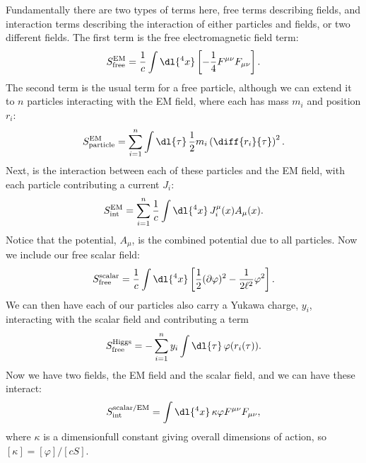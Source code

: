 \documentclass[fleqn]{NotesClass}
\begin{document}
    Fundamentally there are two types of terms here, free terms describing fields, and interaction terms describing the interaction of either particles and fields, or two different fields.
    The first term is the free electromagnetic field term:
    \begin{equation}
        S_{\text{free}}^{\text{EM}} = \frac{1}{c} \int \dl{^4x} \left[ -\frac{1}{4}F^{\mu\nu}F_{\mu\nu} \right].
    \end{equation}
    The second term is the usual term for a free particle, although we can extend it to \(n\) particles interacting with the EM field, where each has mass \(m_i\) and position \(r_i\):
    \begin{equation}
        S_{\text{particle}}^{\text{EM}} = \sum_{i=1}^{n} \int \dl{\tau} \, \frac{1}{2}m_i \left( \diff{r_i}{\tau} \right)^2.
    \end{equation}
    Next, is the interaction between each of these particles and the EM field, with each particle contributing a current \(J_i\):
    \begin{equation}
        S_{\text{int}}^{\text{EM}} = \sum_{i=1}^{n} \frac{1}{c} \int \dl{^4x} \, J_i^\mu(x) A_\mu(x).
    \end{equation}
    Notice that the potential, \(A_\mu\), is the combined potential due to all particles.
    Now we include our free scalar field:
    \begin{equation}
        S_{\text{free}}^{\text{scalar}} = \frac{1}{c} \int \dl{^4x} \left[ \frac{1}{2}(\partial\varphi)^2 - \frac{1}{2\ell^2}\varphi^2 \right].
    \end{equation}
    We can then have each of our particles also carry a Yukawa charge, \(y_i\), interacting with the scalar field and contributing a term
    \begin{equation}
        S_{\text{free}}^{\text{Higgs}} = -\sum_{i=1}^{n} y_i \int \dl{\tau} \, \varphi(r_i(\tau)).
    \end{equation}
    Now we have two fields, the EM field and the scalar field, and we can have these interact:
    \begin{equation}
        S_{\text{int}}^{\text{scalar/EM}} = \int \dl{^4x} \, \kappa \varphi F^{\mu\nu}F_{\mu\nu},
    \end{equation}
    where \(\kappa\) is a dimensionfull constant giving overall dimensions of action, so \([\kappa] = [\varphi]/[cS]\).
    
\end{document}
